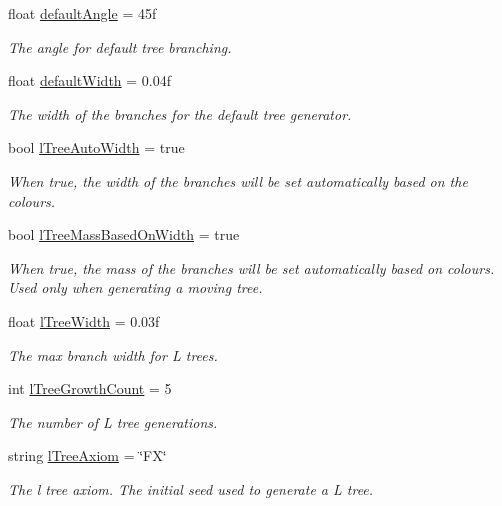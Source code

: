 \begin{DoxyCompactItemize}
float \hyperlink{class_fractal_tree_1_1_tree_builder_a71036891662e482caeb410dadd5bfe65}{default\+Angle} = 45f
\begin{DoxyCompactList}\small\item\em The angle for default tree branching. \end{DoxyCompactList}\item 
float \hyperlink{class_fractal_tree_1_1_tree_builder_a1f60a72d865f9cca5bb155a72ff5f6ef}{default\+Width} = 0.\+04f
\begin{DoxyCompactList}\small\item\em The width of the branches for the default tree generator. \end{DoxyCompactList}\item 
bool \hyperlink{class_fractal_tree_1_1_tree_builder_acc1a7487b339290c552ef136fec40b02}{l\+Tree\+Auto\+Width} = true
\begin{DoxyCompactList}\small\item\em When true, the width of the branches will be set automatically based on the colours. \end{DoxyCompactList}\item 
bool \hyperlink{class_fractal_tree_1_1_tree_builder_a4ba732b60fd74e4db9f5422a7e9ffd82}{l\+Tree\+Mass\+Based\+On\+Width} = true
\begin{DoxyCompactList}\small\item\em When true, the mass of the branches will be set automatically based on colours. Used only when generating a moving tree. \end{DoxyCompactList}\item 
float \hyperlink{class_fractal_tree_1_1_tree_builder_a382d4bba4cac7e05681e75109801dd92}{l\+Tree\+Width} = 0.\+03f
\begin{DoxyCompactList}\small\item\em The max branch width for L trees. \end{DoxyCompactList}\item 
int \hyperlink{class_fractal_tree_1_1_tree_builder_af50b64e86abfc4709fdfc6368ff7504b}{l\+Tree\+Growth\+Count} = 5
\begin{DoxyCompactList}\small\item\em The number of L tree generations. \end{DoxyCompactList}\item 
string \hyperlink{class_fractal_tree_1_1_tree_builder_a0ed6efbc756277236c9b209ebcba829a}{l\+Tree\+Axiom} = \char`\"{}FX\char`\"{}
\begin{DoxyCompactList}\small\item\em The l tree axiom. The initial seed used to generate a L tree. \end{DoxyCompactList}\item 

\end{DoxyCompactItemize}
